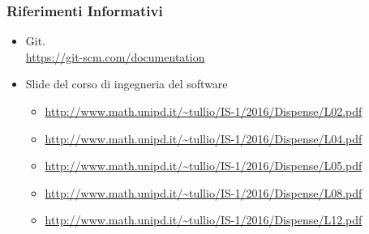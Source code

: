 	    \subsubsection{Riferimenti Informativi}
        \begin{itemize}
        \item Git. \\
        \url{https://git-scm.com/documentation}
         \item Slide del corso di ingegneria del software
          \begin{itemize}
           \item \url{http://www.math.unipd.it/~tullio/IS-1/2016/Dispense/L02.pdf}
           \item \url{http://www.math.unipd.it/~tullio/IS-1/2016/Dispense/L04.pdf}
           \item \url{http://www.math.unipd.it/~tullio/IS-1/2016/Dispense/L05.pdf}
           \item \url{http://www.math.unipd.it/~tullio/IS-1/2016/Dispense/L08.pdf}
           \item \url{http://www.math.unipd.it/~tullio/IS-1/2016/Dispense/L12.pdf}
          \end{itemize}
        \end{itemize}